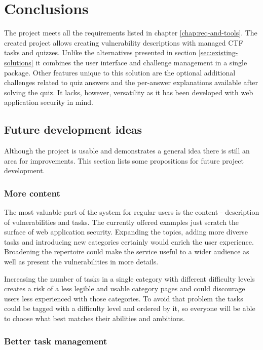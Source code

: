 \chapter{Conclusions}

The project meets all the requirements listed in chapter \ref{chap:req-and-tools}. The created project allows creating vulnerability descriptions with managed CTF tasks and quizzes. Unlike the alternatives presented in section \ref{sec:existing-solutions} it combines the user interface and challenge management in a single package. Other features unique to this solution are the optional additional challenges related to quiz answers and the per-answer explanations available after solving the quiz. It lacks, however, versatility as it has been developed with web application security in mind.

\section{Future development ideas}

Although the project is usable and demonstrates a general idea there is still an area for improvements. This section lists some propositions for future project development.

\subsection{More content}

The most valuable part of the system for regular users is the content - description of vulnerabilities and tasks. The currently offered examples just scratch the surface of web application security. Expanding the topics, adding more diverse tasks and introducing new categories certainly would enrich the user experience. Broadening the repertoire could make the service useful to a wider audience as well as present the vulnerabilities in more details.

Increasing the number of tasks in a single category with different difficulty levels creates a risk of a less legible and usable category pages and could discourage users less experienced with those categories. To avoid that problem the tasks could be tagged with a difficulty level and ordered by it, so everyone will be able to choose what best matches their abilities and ambitions.

\subsection{Better task management}

